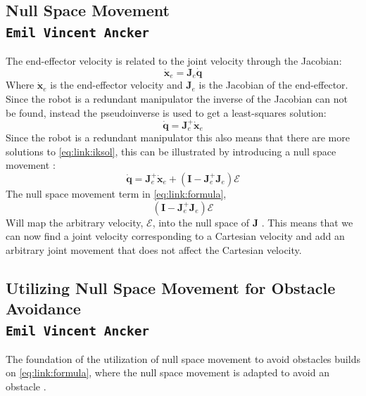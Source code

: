 \documentclass[../main.tex]{subfiles}
\begin{document}
\subsection{Null Space Movement \\ \normalfont\normalsize\texttt{Emil Vincent Ancker}}
The end-effector velocity is related to the joint velocity through the Jacobian:
\begin{equation}
    \dot{\boldsymbol{x}}_e = \boldsymbol{J}_e \dot{\boldsymbol{q}}
\end{equation}
Where $\dot{\boldsymbol{x}}_e$ is the end-effector velocity and $\boldsymbol{J}_e$ is the Jacobian of the end-effector. Since the robot is a redundant manipulator the inverse of the Jacobian can not be found, instead the pseudoinverse is used to get a least-squares solution:
\begin{equation} \label{eq:link:iksol}
    \dot{\boldsymbol{q}} = \boldsymbol{J}_e^+ \dot{\boldsymbol{x}}_e
\end{equation}
Since the robot is a redundant manipulator this also means that there are more solutions to \autoref{eq:link:iksol}, this can be illustrated by introducing a null space movement \cite{maciejewski_obstacle_1985}:
\begin{equation} \label{eq:link:formula}
    \dot{\boldsymbol{q}} = \boldsymbol{J}_e^+\dot{\boldsymbol{x}}_e + \left( \boldsymbol{I} - \boldsymbol{J}_e^+\boldsymbol{J}_e \right)\boldsymbol{\mathcal{E}}
\end{equation}
The null space movement term in \autoref{eq:link:formula},
\begin{equation}
    \left( \boldsymbol{I} - \boldsymbol{J}_e^+\boldsymbol{J}_e \right)\boldsymbol{\mathcal{E}}
\end{equation}
Will map the arbitrary velocity, $\boldsymbol{\mathcal{E}}$, into the null space of $\boldsymbol{J}$ \cite{buss_introduction_nodate}. This means that we can now find a joint velocity corresponding to a Cartesian velocity and add an arbitrary joint movement that does not affect the Cartesian velocity.

\subsection{Utilizing Null Space Movement for Obstacle Avoidance \\ \normalfont\normalsize\texttt{Emil Vincent Ancker}}
The foundation of the utilization of null space movement to avoid obstacles builds on \autoref{eq:link:formula}, where the null space movement is adapted to avoid an obstacle \cite{dae-hyung_park_movement_2008}.
\end{document}
